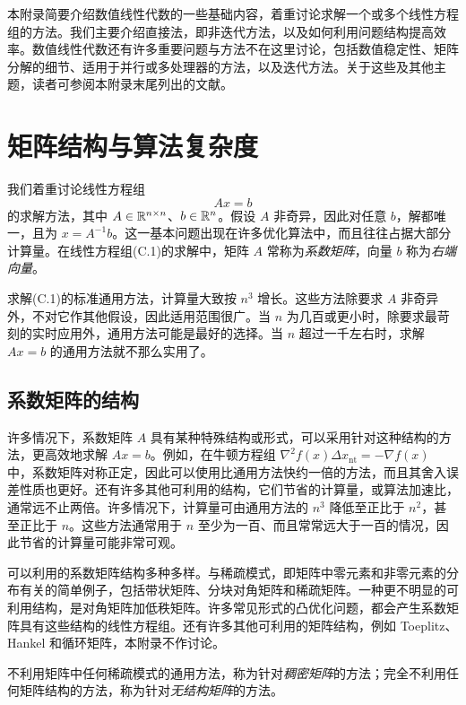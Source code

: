 本附录简要介绍数值线性代数的一些基础内容，着重讨论求解一个或多个线性方程组的方法。我们主要介绍直接法，即非迭代方法，以及如何利用问题结构提高效率。数值线性代数还有许多重要问题与方法不在这里讨论，包括数值稳定性、矩阵分解的细节、适用于并行或多处理器的方法，以及迭代方法。关于这些及其他主题，读者可参阅本附录末尾列出的文献。

\section{矩阵结构与算法复杂度}
我们着重讨论线性方程组
\begin{equation}
 Ax=b\tag{C.1}
\end{equation}
的求解方法，其中 $A\in\mathbb R^{n\times n}$、$b\in\mathbb R^n$。假设 $A$ 非奇异，因此对任意 $b$，解都唯一，且为 $x=A^{-1}b$。这一基本问题出现在许多优化算法中，而且往往占据大部分计算量。在线性方程组(C.1)的求解中，矩阵 $A$ 常称为\emph{系数矩阵}，向量 $b$ 称为\emph{右端向量}。

求解(C.1)的标准通用方法，计算量大致按 $n^3$ 增长。这些方法除要求 $A$ 非奇异外，不对它作其他假设，因此适用范围很广。当 $n$ 为几百或更小时，除要求最苛刻的实时应用外，通用方法可能是最好的选择。当 $n$ 超过一千左右时，求解 $Ax=b$ 的通用方法就不那么实用了。

\subsection*{系数矩阵的结构}
许多情况下，系数矩阵 $A$ 具有某种特殊结构或形式，可以采用针对这种结构的方法，更高效地求解 $Ax=b$。例如，在牛顿方程组 $\nabla^2f(x)\Delta x_{\mathrm{nt}}=-\nabla f(x)$ 中，系数矩阵对称正定，因此可以使用比通用方法快约一倍的方法，而且其舍入误差性质也更好。还有许多其他可利用的结构，它们节省的计算量，或算法加速比，通常远不止两倍。许多情况下，计算量可由通用方法的 $n^3$ 降低至正比于 $n^2$，甚至正比于 $n$。这些方法通常用于 $n$ 至少为一百、而且常常远大于一百的情况，因此节省的计算量可能非常可观。

可以利用的系数矩阵结构多种多样。与稀疏模式，即矩阵中零元素和非零元素的分布有关的简单例子，包括带状矩阵、分块对角矩阵和稀疏矩阵。一种更不明显的可利用结构，是对角矩阵加低秩矩阵。许多常见形式的凸优化问题，都会产生系数矩阵具有这些结构的线性方程组。还有许多其他可利用的矩阵结构，例如 Toeplitz、Hankel 和循环矩阵，本附录不作讨论。

不利用矩阵中任何稀疏模式的通用方法，称为针对\emph{稠密矩阵}的方法；完全不利用任何矩阵结构的方法，称为针对\emph{无结构矩阵}的方法。

